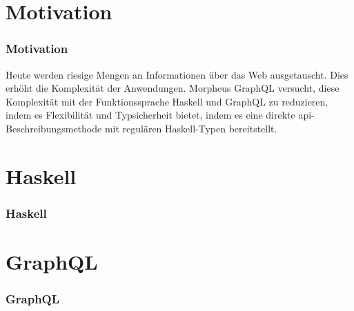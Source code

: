 
\section{Motivation}

\begin{frame}{}
    \frametitle{Motivation}

    Heute werden riesige Mengen an Informationen über das Web ausgetauscht. Dies erhöht die Komplexität der Anwendungen. Morpheus GraphQL versucht, diese Komplexität mit der Funktionssprache Haskell und GraphQL zu reduzieren, indem es Flexibilität und Typsicherheit bietet, indem es eine direkte api-Beschreibungsmethode mit regulären Haskell-Typen bereitstellt. 
    
\end{frame}



\section{Haskell}

\begin{frame}{}
    \frametitle{Haskell}
\end{frame}


\section{GraphQL}
\begin{frame}{}
    \frametitle{GraphQL}
\end{frame}
